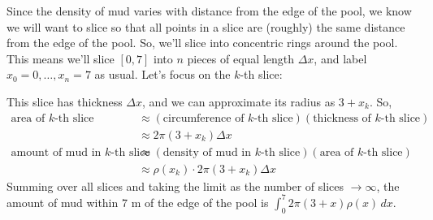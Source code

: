 \documentclass{article}
\begin{document}
\begin{enumerate}
\begin{enumerate}
\begin{enumerate}
\begin{solution}
        Since the density of mud varies with distance from the edge of the
        pool, we know we will want to slice so that all points in a slice
        are (roughly) the same distance from the edge of the pool.  So,
        we'll slice into concentric rings around the pool.  This means
        we'll slice $[0, 7]$ into $n$ pieces of equal length $\Delta x$,
        and label $x_0 = 0, \ldots, x_n = 7$ as usual.  Let's focus on the
        $k$-th slice:
        \begin{center}
        \end{center}
        This slice has thickness $\Delta x$, and we can approximate its
        radius as $3+x_k$.  So,
        \begin{align*}
          \text{area of $k$-th slice} & \approx (\text{circumference of
            $k$-th slice})(\text{thickness of $k$-th slice}) \\
          & \approx 2 \pi (3 + x_k) \Delta x \\
          \text{amount of mud in $k$-th slice} & \approx (\text{density of
            mud in $k$-th slice}) (\text{area of $k$-th
            slice}) \\
          & \approx \rho (x_k) \cdot 2 \pi (3 + x_k) \Delta x
        \end{align*}
        Summing over all slices and taking the limit as the number of
        slices $\to \infty$, the amount of mud within $7$ m of the edge of
        the pool is $\boxed{\int_0^{7} 2\pi(3+x) \rho(x)\,dx}$.
      \end{solution}


\end{enumerate}
\end{enumerate}
\end{enumerate}
\end{document}
